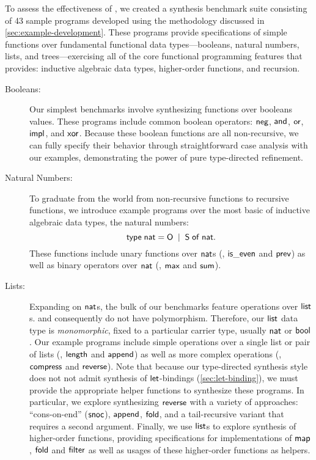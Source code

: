 To assess the effectiveness of \myth{}, we created a synthesis benchmark suite consisting of 43 sample \myth{} programs developed using the methodology discussed in \autoref{sec:example-development}.
These programs provide specifications of simple functions over fundamental functional data types---booleans, natural numbers, lists, and trees---exercising all of the core functional programming features that \myth{} provides: inductive algebraic data types, higher-order functions, and recursion.
\begin{description}
  \item[Booleans:]
    Our simplest benchmarks involve synthesizing functions over booleans values.
    These programs include common boolean operators: $\mathsf{neg}$, $\mathsf{and}$, $\mathsf{or}$, $\mathsf{impl}$, and $\mathsf{xor}$.
    Because these boolean functions are all non-recursive, we can fully specify their behavior through straightforward case analysis with our examples, demonstrating the power of pure type-directed refinement.

  \item[Natural Numbers:]
    To graduate from the world from non-recursive functions to recursive functions, we introduce example programs over the most basic of inductive algebraic data types, the natural numbers:
    \[
      \mathsf{type}\;\mathsf{nat} = \mathsf{O} \;\mathrel{\mid}\; \mathsf{S}\;\mathsf{of}\;\mathsf{nat}.
    \]
    These functions include unary functions over $\mathsf{nat}$s (\eg, $\mathsf{is\_even}$ and $\mathsf{prev}$) as well as binary operators over $\mathsf{nat}$ (\eg, $\mathsf{max}$ and $\mathsf{sum}$).

  \item[Lists:]
    Expanding on $\mathsf{nat}$s, the bulk of our benchmarks feature operations over $\mathsf{list}$s.
    \mlsyn{} and consequently \myth{} do not have polymorphism.
    Therefore, our $\mathsf{list}$ data type is \emph{monomorphic}, fixed to a particular carrier type, usually $\mathsf{nat}$ or $\mathsf{bool}$.
    Our example programs include simple operations over a single list or pair of lists (\eg, $\mathsf{length}$ and $\mathsf{append}$) as well as more complex operations (\eg, $\mathsf{compress}$ and $\mathsf{reverse}$).
    Note that because our type-directed synthesis style does not not admit synthesis of $\mathsf{let}$-bindings (\autoref{sec:let-binding}), we must provide the appropriate helper functions to synthesize these programs.
    In particular, we explore synthesizing $\mathsf{reverse}$ with a variety of approaches: ``cons-on-end'' ($\mathsf{snoc}$), $\mathsf{append}$, $\mathsf{fold}$, and a tail-recursive variant that requires a second argument.
    Finally, we use $\mathsf{list}$s to explore synthesis of higher-order functions, providing specifications for implementations of $\mathsf{map}$, $\mathsf{fold}$ and $\mathsf{filter}$ as well as usages of these higher-order functions as helpers.


\end{description}
